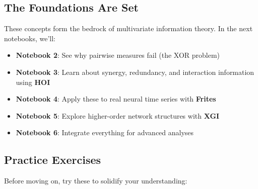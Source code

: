 \documentclass[
  11pt,
  letterpaper,
  oneside,
  openany]{book}
\providecommand{\tightlist}{%
  \setlength{\itemsep}{0pt}\setlength{\parskip}{0pt}}
\begin{document}
\subsection{The Foundations Are Set}\label{the-foundations-are-set}

These concepts form the bedrock of multivariate information theory. In
the next notebooks, we'll:

\begin{itemize}
\tightlist
\item
  \textbf{Notebook 2}: See why pairwise measures fail (the XOR problem)
\item
  \textbf{Notebook 3}: Learn about synergy, redundancy, and interaction
  information using \textbf{HOI}
\item
  \textbf{Notebook 4}: Apply these to real neural time series with
  \textbf{Frites}
\item
  \textbf{Notebook 5}: Explore higher-order network structures with
  \textbf{XGI}
\item
  \textbf{Notebook 6}: Integrate everything for advanced analyses
\end{itemize}

\subsection{Practice Exercises}\label{practice-exercises}

Before moving on, try these to solidify your understanding:
\end{document}
